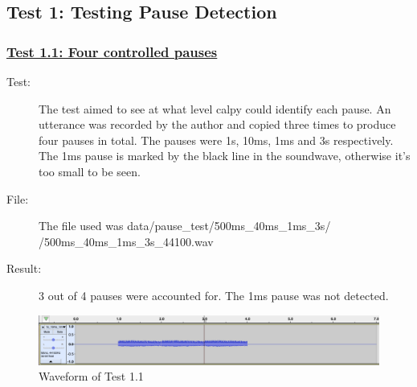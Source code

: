 \subsection{Test 1: Testing Pause Detection}
\subsubsection{\underline{Test 1.1: Four controlled pauses}}
\begin{description}
	\item[Test:] The test aimed to see at what level calpy could identify each pause. 
				An utterance was recorded by the author and copied three times to produce four pauses in total.
				The pauses were 1s, 10ms, 1ms and 3s respectively.
				The 1ms pause is marked by the black line in the soundwave, otherwise it's too small to be seen.
	\item[File:] The file used was data/pause\_test/500ms\_40ms\_1ms\_3s/ \\
	\space\space\space{}/500ms\_40ms\_1ms\_3s\_44100.wav
	\item[Result:] 3 out of 4 pauses were accounted for. The 1ms pause was not detected.
\end{description}
\begin{figure}[h]
	\center
	\includegraphics[scale=0.3]{src/main-matter/results/preliminary-testing/detection/1s_10ms_1ms_3s}
	\caption{Waveform of Test 1.1}
	\label{fig:011}
\end{figure}

